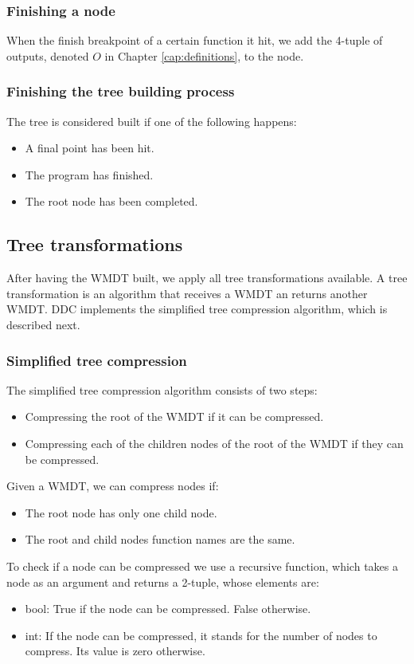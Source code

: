 \subsubsection{Finishing a node}
When the finish breakpoint of a certain function it hit, we add the 4-tuple of outputs, denoted \(O\) in Chapter \ref{cap:definitions}, to the node.
\subsubsection{Finishing the tree building process}
The tree is considered built if one of the following happens:
\begin{itemize}
    \item A final point has been hit.
    \item The program has finished.
    \item The root node has been completed.
\end{itemize}
\subsection{Tree transformations}
After having the WMDT built, we apply all tree transformations available.
A tree transformation is an algorithm that receives a WMDT an returns another WMDT.
DDC implements the simplified tree compression algorithm, which is described next.
\subsubsection{Simplified tree compression}
The simplified tree compression algorithm consists of two steps:
\begin{itemize}
    \item Compressing the root of the WMDT if it can be compressed.
    \item Compressing each of the children nodes of the root of the WMDT if they can be compressed.
\end{itemize}
Given a WMDT, we can compress nodes if:
\begin{itemize}
    \item The root node has only one child node.
    \item The root and child nodes function names are the same.
\end{itemize}
To check if a node can be compressed we use a recursive function, which takes a node as an argument and returns a 2-tuple, whose elements are:
\begin{itemize}
    \item bool: True if the node can be compressed. False otherwise.
    \item int: If the node can be compressed, it stands for the number of nodes to compress. Its value is zero otherwise.
\end{itemize}

